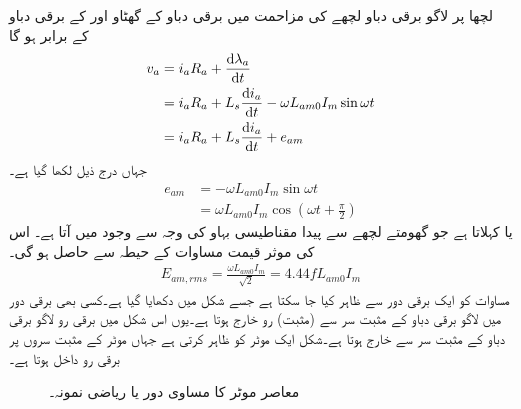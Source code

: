 لچھا  پر لاگو برقی دباو لچھے کی مزاحمت  میں برقی دباو کے گھٹاو اور  کے برقی دباو کے برابر ہو گا
\begin{gather}
\begin{aligned}\label{مساوات_معاصر_دباو_مساوی_مزاحمت_گھتاو_اور_پیدا_دباو}
v_a&=i_a R_a+\frac{\dif \lambda_a}{\dif t}\\
&=i_a R_a+L_s \frac{\dif i_a}{\dif t}-\omega L_{am0} I_m \sin \omega t\\
&=i_a R_a+L_s \frac{\dif i_a}{\dif t}+e_{am}
\end{aligned}
\end{gather}
جہاں درج ذیل لکھا گیا  ہے۔
\begin{align}\label{مساوات_معاصر_امالی_دباو}
e_{am}&=-\omega L_{am0} I_m \sin \omega t\nonumber\\
&=\omega L_{am0} I_m \cos \left (\omega t+\frac{\pi}{2} \right)
\end{align}
 یا  کہلاتا ہے جو گھومتے لچھے سے پیدا مقناطیسی بہاو کی وجہ سے وجود میں آتا ہے۔  اس کی موثر قیمت  مساوات  کے حیطہ    سے حاصل ہو گی۔
\begin{align}\label{مساوات_معاصر_موثر_پیدا_دباو}
E_{am,rms}=\frac{\omega L_{am0} I_m}{\sqrt{2}}=4.44 f L_{am0} I_m
\end{align}
مساوات   کو ایک برقی دور سے ظاہر کیا جا سکتا ہے جسے شکل   میں دکھایا گیا ہے۔کسی بھی برقی دور میں لاگو برقی دباو کے  مثبت سر سے (مثبت) رو خارج ہوتا ہے۔یوں اس شکل میں برقی رو  لاگو برقی دباو  کے مثبت سر سے خارج ہوتا ہے۔شکل  ایک موٹر کو ظاہر کرتی ہے جہاں موٹر کے مثبت سروں پر برقی رو داخل ہوتا ہے۔
\begin{figure}
\centering
\caption{معاصر موٹر کا مساوی دور یا ریاضی نمونہ۔}
\label{شکل_معاصر_موٹر_کا_مساوی_دور}
\end{figure}
